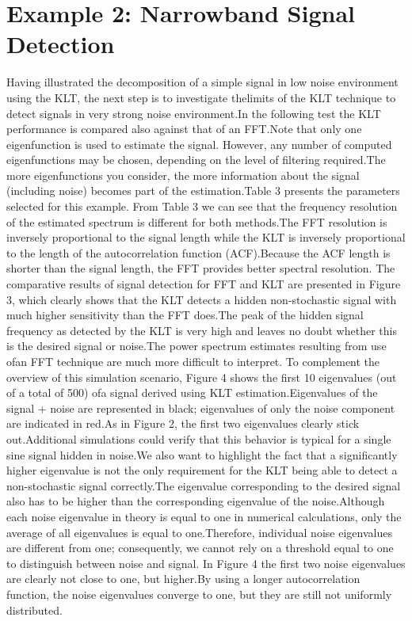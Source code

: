 \documentclass[12pt]{report}
\begin{document}
\section*{Example 2: Narrowband Signal Detection}
Having illustrated the decomposition of a simple signal in low noise environment using the KLT, the next step is to
investigate thelimits of the KLT technique to detect signals in very strong noise environment.\@ In the following test the KLT performance is compared also against that of an FFT.\@ Note that only one eigenfunction is used to estimate the signal.
However, any number of computed eigenfunctions may be chosen, depending on the level of filtering required.\@ The more eigenfunctions you consider, the more information about the signal (including noise) becomes part of the estimation.\@ Table 3 presents the parameters selected for this example.
From Table 3 we can see that the frequency resolution of the estimated spectrum is different for both methods.\@ The FFT resolution is inversely proportional to the signal length while the KLT is inversely proportional to the length of the autocorrelation function (ACF).\@ Because the ACF length is shorter than the signal length, the FFT provides better spectral resolution.
The comparative results of signal detection for FFT and KLT are presented in Figure 3, which clearly shows that the KLT detects a hidden non-stochastic signal with much higher sensitivity than the FFT does.\@ The peak of the hidden signal frequency as detected by the KLT is very high and leaves no doubt whether this is the desired signal or noise.\@ The power spectrum estimates resulting from use ofan FFT technique are much more difficult to interpret.
To complement the overview of this simulation scenario, Figure 4 shows the first 10 eigenvalues (out of a total of 500) ofa signal derived using KLT estimation.\@ Eigenvalues of the signal + noise are represented in black; eigenvalues of only the noise component are indicated in red.\@ As in Figure 2, the first two eigenvalues clearly stick out.\@ Additional simulations could verify that this behavior is typical for a single sine signal hidden in noise.We also want to highlight the fact that a significantly higher
eigenvalue is not the only requirement for the KLT being able to detect a non-stochastic signal correctly.\@ The eigenvalue corresponding to the desired signal also has to be higher than the corresponding eigenvalue of the noise.\@ Although each noise eigenvalue in theory is equal to one in numerical calculations, only the average of all eigenvalues is equal to one.\@ Therefore, individual noise eigenvalues are different from one; consequently, we cannot rely on a threshold equal to one to distinguish between noise and signal.
In Figure 4 the first two noise eigenvalues are clearly not close to one, but higher.\@ By using a longer autocorrelation function, the noise eigenvalues converge to one, but they are still not
uniformly distributed.
\end{document}
